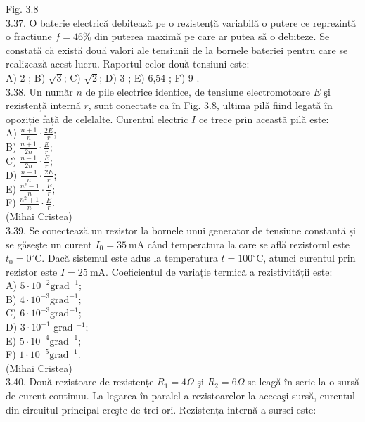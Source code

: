 \documentclass[10pt]{article}
\begin{document}
Fig. 3.8\\
3.37. O baterie electrică debitează pe o rezistență variabilă o putere ce reprezintă o fracțiune $f=46 \%$ din puterea maximă pe care ar putea să o debiteze. Se constată că există două valori ale tensiunii de la bornele bateriei pentru care se realizează acest lucru. Raportul celor două tensiuni este:\\
A) 2 ; B) $\sqrt{3}$; C) $\sqrt{2}$; D) 3 ; E) 6,54 ; F) 9 .\\
3.38. Un număr $n$ de pile electrice identice, de tensiune electromotoare $E$ şi rezistență internă $r$, sunt conectate ca în Fig. 3.8, ultima pilă fiind legată în opoziție față de celelalte. Curentul electric $I$ ce trece prin această pilă este:\\
A) $\frac{n+1}{n} \cdot \frac{2 E}{r}$;\\
B) $\frac{n+1}{2 n} \cdot \frac{E}{r}$;\\
C) $\frac{n-1}{2 n} \cdot \frac{E}{r}$;\\
D) $\frac{n-1}{n} \cdot \frac{2 E}{r}$;\\
E) $\frac{n^{2}-1}{n} \cdot \frac{E}{r}$;\\
F) $\frac{n^{2}+1}{n} \cdot \frac{E}{r}$.\\
(Mihai Cristea)\\
3.39. Se conectează un rezistor la bornele unui generator de tensiune constantă și se găseşte un curent $I_{0}=35 \mathrm{~mA}$ când temperatura la care se află rezistorul este $t_{0}=0^{\circ} \mathrm{C}$. Dacă sistemul este adus la temperatura $t=100^{\circ} \mathrm{C}$, atunci curentul prin rezistor este $I=25 \mathrm{~mA}$. Coeficientul de variație termică a rezistivității este:\\
A) $5 \cdot 10^{-2} \mathrm{grad}^{-1}$;\\
B) $4 \cdot 10^{-3} \mathrm{grad}^{-1}$;\\
C) $6 \cdot 10^{-3} \mathrm{grad}^{-1}$;\\
D) $3 \cdot 10^{-1}$ grad $^{-1}$;\\
E) $5 \cdot 10^{-4} \mathrm{grad}^{-1}$;\\
F) $1 \cdot 10^{-5} \mathrm{grad}^{-1}$.\\
(Mihai Cristea)\\
3.40. Două rezistoare de rezistențe $R_{1}=4 \Omega$ şi $R_{2}=6 \Omega$ se leagă în serie la o sursă de curent continuu. La legarea în paralel a rezistoarelor la aceeaşi sursă, curentul din circuitul principal creşte de trei ori. Rezistența internă a sursei este:\\
\end{document}
